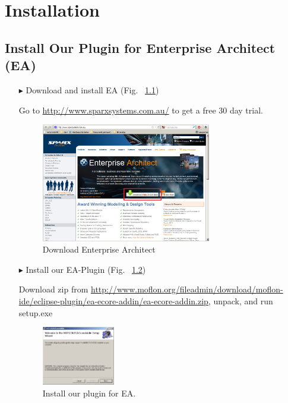 \chapter{Installation}

\section{Install Our Plugin for Enterprise Architect (EA)}
\begin{enumerate}
\item[$\blacktriangleright$] Download and install EA (Fig.~
\ref{fig_enterpriseArchitextHomepage}) 
\item[] Go to \url{http://www.sparxsystems.com.au/} to get a free 30 day trial.
\begin{figure}[!h]
	\centering
  \includegraphics[width=0.7\textwidth]{pics/ea_download.png}
	\caption{Download Enterprise Architect}
	\label{fig_enterpriseArchitextHomepage}
\end{figure} 
\item[$\blacktriangleright$] Install our EA-Plugin (Fig.~
\ref{fig_eaPluginWizard})
\item[] Download zip from
\url{http://www.moflon.org/fileadmin/download/moflon-ide/eclipse-plugin/ea-ecore-addin/ea-ecore-addin.zip},
unpack, and run setup.exe
\begin{figure}[!h]
	\centering
  \includegraphics[width=0.3\textwidth]{pics/eaplugin_install.png}
	\caption{Install our plugin for EA.}
	\label{fig_eaPluginWizard}
\end{figure}
\end{enumerate}

